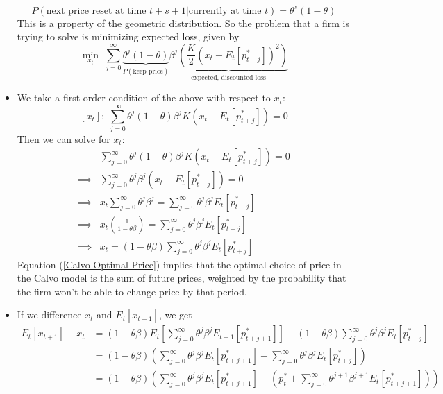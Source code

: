 \documentclass[12pt]{article}
\begin{document}
\begin{itemize}
    \[P(\text{next price reset at time $t+s+1$}|\text{currently at time $t$}) = \theta^{s}(1-\theta)\]
    This is a property of the geometric distribution. So the problem that a firm is trying to solve is minimizing expected loss, given by
    \[\min_{x_t}\; \sum_{j=0}^{\infty}\underbrace{\theta^j(1-\theta)}_{P(\text{keep price})}\underbrace{\beta^j\left(\frac{K}{2}(x_t - E_t[p_{t+j}^*])^2\right)}_{\text{expected, discounted loss}}\]
    \item We take a first-order condition of the above with respect to $x_t$:
    \[[x_t]:\; \sum_{j=0}^{\infty}\theta^j(1-\theta)\beta^jK\left(x_t - E_t[p_{t+j}^*]\right) = 0\]
    Then we can solve for $x_t$:
    \begin{equation}\label{Calvo Optimal Price}
        \begin{split}
            &\sum_{j=0}^{\infty}\theta^j(1-\theta)\beta^jK\left(x_t - E_t[p_{t+j}^*]\right) = 0 \\
            \implies &\sum_{j=0}^{\infty}\theta^j\beta^j\left(x_t - E_t[p_{t+j}^*]\right) = 0 \\
            \implies &x_t\sum_{j=0}^{\infty}\theta^j\beta^j = \sum_{j=0}^{\infty}\theta^j\beta^jE_t[p_{t+j}^*] \\
            \implies &x_t\left(\frac{1}{1-\theta\beta}\right) = \sum_{j=0}^{\infty}\theta^j\beta^jE_t[p_{t+j}^*] \\
            \implies &x_t = (1-\theta\beta)\sum_{j=0}^{\infty}\theta^j\beta^jE_t[p_{t+j}^*]
        \end{split}
    \end{equation}
    Equation (\ref{Calvo Optimal Price}) implies that the optimal choice of price in the Calvo model is the sum of future prices, weighted by the probability that the firm won't be able to change price by that period.
    \item If we difference $x_t$ and $E_t[x_{t+1}]$, we get
    \[\begin{split}
        E_t[x_{t+1}] - x_t &= (1-\theta\beta)E_t\left[\sum_{j=0}^{\infty}\theta^j\beta^jE_{t+1}[p_{t+j+1}^*]\right] - (1-\theta\beta)\sum_{j=0}^{\infty}\theta^j\beta^jE_t[p_{t+j}^*]\\ 
        &= (1-\theta\beta)\left(\sum_{j=0}^{\infty}\theta^j\beta^jE_t[p_{t+j+1}^*] - \sum_{j=0}^{\infty}\theta^j\beta^jE_t[p_{t+j}^*]\right)\\ 
        &= (1-\theta\beta)\left(\sum_{j=0}^{\infty}\theta^j\beta^jE_t[p_{t+j+1}^*] - \left(p_t^* + \sum_{j=0}^{\infty}\theta^{j+1}\beta^{j+1}E_t[p_{t+j+1}^*]\right)\right)\\ 

\end{split}\]
\end{itemize}
\end{document}
